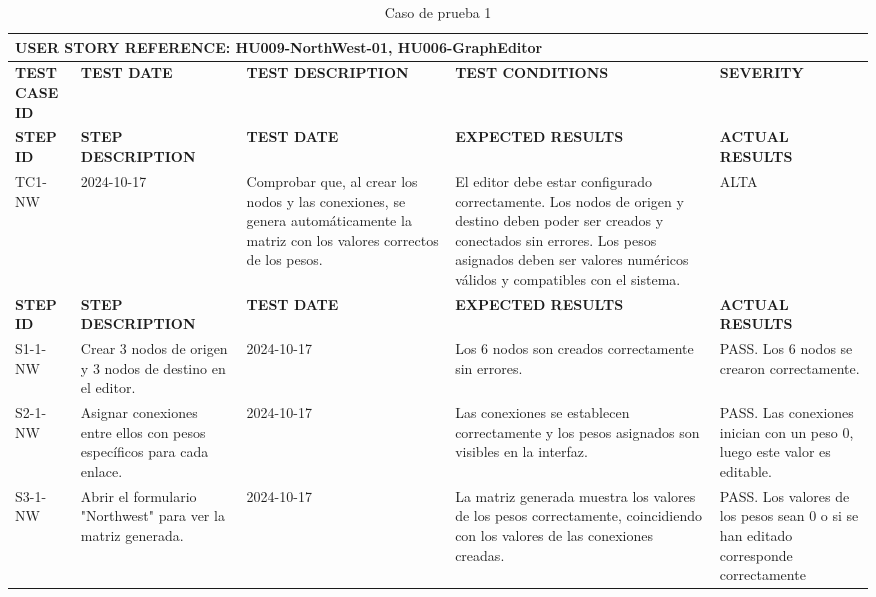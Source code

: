 \documentclass[stu, 12pt, letterpaper, donotrepeattitle, floatsintext, natbib]{apa7}
\begin{document}
\small %
\renewcommand{\arraystretch}{1.0} %
\setlength{\tabcolsep}{4pt} %

\begin{longtable}{|p{2cm}|p{3cm}|p{3cm}|p{3cm}|p{3cm}|}
  \caption{Caso de prueba 1} \label{tab:casos_prueba1} \\
  \hline
    \multicolumn{5}{|l|}{\textbf{USER STORY REFERENCE: HU009-NorthWest-01, HU006-GraphEditor}} \\ \hline

  \textbf{TEST CASE ID} & \textbf{TEST DATE} & \textbf{TEST DESCRIPTION} & \textbf{TEST CONDITIONS} & \textbf{SEVERITY} \\ \hline
  \endfirsthead
  \hline
  \textbf{STEP ID} & \textbf{STEP DESCRIPTION} & \textbf{TEST DATE} & \textbf{EXPECTED RESULTS} & \textbf{ACTUAL RESULTS} \\ \hline
  \endhead
  TC1-NW & 2024-10-17 & Comprobar que, al crear los nodos y las conexiones, se genera automáticamente la matriz con los valores correctos de los pesos. & El editor debe estar configurado correctamente. Los nodos de origen y destino deben poder ser creados y conectados sin errores. Los pesos asignados deben ser valores numéricos válidos y compatibles con el sistema. & ALTA \\ \hline
\textbf{STEP ID} & \textbf{STEP DESCRIPTION} & \textbf{TEST DATE} & \textbf{EXPECTED RESULTS} & \textbf{ACTUAL RESULTS} \\ \hline
S1-1-NW & Crear 3 nodos de origen y 3 nodos de destino en el editor. & 2024-10-17 & Los 6 nodos son creados correctamente sin errores. & PASS. Los 6 nodos se crearon correctamente. \\ \hline
S2-1-NW & Asignar conexiones entre ellos con pesos específicos para cada enlace. & 2024-10-17 & Las conexiones se establecen correctamente y los pesos asignados son visibles en la interfaz. & PASS. Las conexiones inician con un peso 0, luego este valor es editable. \\ \hline
S3-1-NW & Abrir el formulario "Northwest" para ver la matriz generada. & 2024-10-17 & La matriz generada muestra los valores de los pesos correctamente, coincidiendo con los valores de las conexiones creadas. & PASS. Los valores de los pesos sean 0 o si se han editado corresponde correctamente \\ \hline
\end{longtable}
\end{document}
